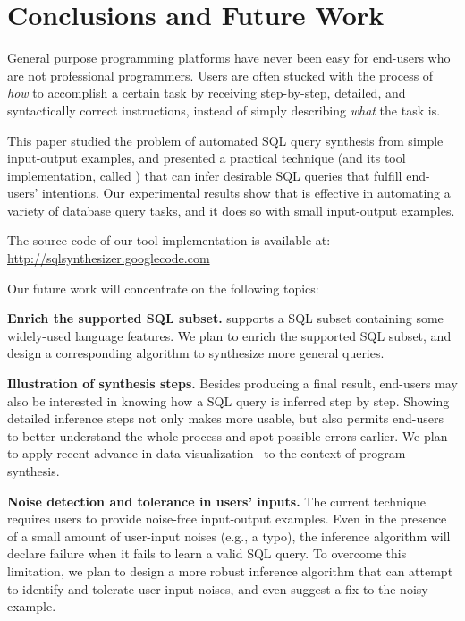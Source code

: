 \section{Conclusions and Future Work}
\label{sec:conclusion}

General purpose programming platforms have never been easy for
end-users who are not professional programmers.
Users are often stucked with the process
of \textit{how} to accomplish a certain task by receiving 
step-by-step, detailed, and syntactically correct instructions, 
instead of simply describing
\textit{what} the task is. 


This paper studied the problem of automated SQL query synthesis
from simple input-output examples, and presented a
practical technique (and its tool implementation, called \ourtool)
that can infer desirable SQL queries that fulfill end-users' intentions.
Our experimental results show that \ourtool is
effective in automating a variety of database query tasks,
and it does so with small input-output examples.

The source code of our tool implementation is available at: \\
\url{http://sqlsynthesizer.googlecode.com}

\vspace{1mm}

Our future work will concentrate on the following topics:

\textbf{Enrich the supported SQL subset.} \ourtool supports
a SQL subset containing some widely-used language features.
We plan to enrich the
supported SQL subset, and design a corresponding algorithm
to synthesize more general queries.

\textbf{Illustration of synthesis steps.} Besides
producing a final result, end-users may also be interested in knowing
how a SQL query is inferred step by step.
Showing detailed inference steps not
only makes \ourtool more usable, but also permits
end-users to better understand the whole process and
spot possible errors earlier.
We plan to apply recent advance in data visualization~\cite{Kandel:2011}
to the context of program synthesis.

\textbf{Noise detection and tolerance in users' inputs.} The current technique
requires users to provide noise-free input-output examples.
Even in the presence of a small amount of user-input noises (e.g., a typo),
the inference algorithm will declare failure when it fails to learn
a valid SQL query.
To overcome this limitation, we plan to design a more robust inference
algorithm that can attempt to identify and tolerate user-input noises,
and even suggest a fix to the noisy example.



